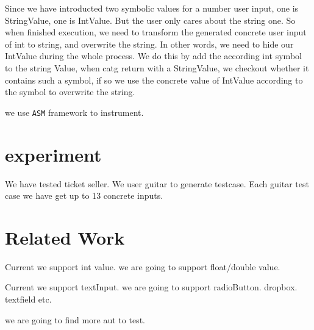 \documentclass{article}
\begin{document}
Since we have introducted two symbolic values for a number user input, one is StringValue, one is IntValue. But the user only cares about the string one. So when finished execution, we need to transform the generated concrete user input of int to string, and overwrite the string. In other words, we need to hide our IntValue during the whole process. We do this by add the according int symbol to the string Value, when catg return with a StringValue, we checkout whether it contains such a symbol, if so we use the concrete value of IntValue according to the symbol to overwrite the string.


we use \texttt{ASM} framework to instrument.

\section{experiment}
We have tested ticket seller. We user guitar to generate testcase. Each guitar test case we have get up to 13 concrete inputs.


\section{Related Work}\label{section:relatedwork}
Current we support int value.
we are going to support float/double value.

Current we support textInput.
we are going to support radioButton. dropbox. textfield etc.

we are going to find more aut to test.




\end{document}
